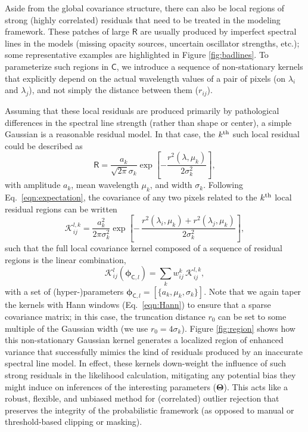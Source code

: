 \documentclass[iop,floatfix]{emulateapj}
\newcommand{\vR}{\mathsf{R}}
\newcommand{\vC}{\mathsf{C}}
\newcommand{\vT}{ {\bm \Theta}}
\newcommand{\vp}{ {\bm \phi}}
\newcommand{\KK}{\mathcal{K}}
\newcommand{\Klocal}{\KK^l}
\begin{document}
Aside from the global covariance structure, there can also be local regions of strong (highly 
correlated) residuals that need to be treated in the modeling framework.  These patches of large 
$\vR$ are usually produced by imperfect spectral lines in the models (missing opacity sources, 
uncertain oscillator strengths, etc.); some representative examples are highlighted in Figure 
\ref{fig:badlines}.  To parameterize such regions in $\vC$, we introduce a sequence of 
non-stationary kernels that explicitly depend on the actual wavelength values of a pair of pixels 
(on $\lambda_i$ and $\lambda_j$), and not simply the distance between them ($r_{ij}$).  

Assuming that these local residuals are produced primarily by pathological differences in the 
spectral line strength (rather than shape or center), a simple Gaussian is a reasonable residual 
model.  In that case, the $k^{\rm th}$ such local residual could be described as
\begin{equation}
\vR = \frac{a_k}{\sqrt{2\pi}{\sigma_k}} \exp \left[ - \frac{r^2(\lambda,\mu_k)}{2\sigma_k^2} \right],
\end{equation}
with amplitude $a_k$, mean wavelength $\mu_k$, and width $\sigma_k$.  Following 
Eq.~\ref{eqn:expectation}, the covariance of any two pixels related to the $k^{\rm th}$ local 
residual regions can be written
\begin{equation} \label{eqn:kregion}
  \mathcal{K}^{l,k}_{ij} = \frac{a_k^2}{2\pi\sigma_k^2} \exp \left [ - \, \frac{r^2(\lambda_i, \mu_k) + r^2(\lambda_j, \mu_k)}{2 \sigma_k^2}\right ],
\end{equation}
such that the full local covariance kernel composed of a sequence of residual regions is the linear 
combination,
\begin{equation} \label{eqn:klocal}
\Klocal_{ij}(\vp_{{\mathsf C},l}) = \sum_k w^k_{ij} \, \mathcal{K}^{l,k}_{ij},
\end{equation}
with a set of (hyper-)parameters $\vp_{{\mathsf C},l} = [\{a_k, \mu_k, \sigma_k\}]$.  Note that we 
again taper the kernels with Hann windows (Eq.~\ref{eqn:Hann}) to ensure that a sparse covariance 
matrix; in this case, the truncation distance $r_0$ can be set to some multiple of the Gaussian 
width (we use $r_0 = 4\sigma_k$).  Figure \ref{fig:region} shows how this non-stationary Gaussian 
kernel generates a localized region of enhanced variance that successfully mimics the kind of 
residuals produced by an inaccurate spectral line model.  In effect, these kernels down-weight the 
influence of such strong residuals in the likelihood calculation, mitigating any potential bias 
they might induce on inferences of the interesting parameters ($\vT$).  This acts like a robust, 
flexible, and unbiased method for (correlated) outlier rejection that preserves the integrity of 
the probabilistic framework (as opposed to manual or threshold-based clipping or masking).  
\end{document}
